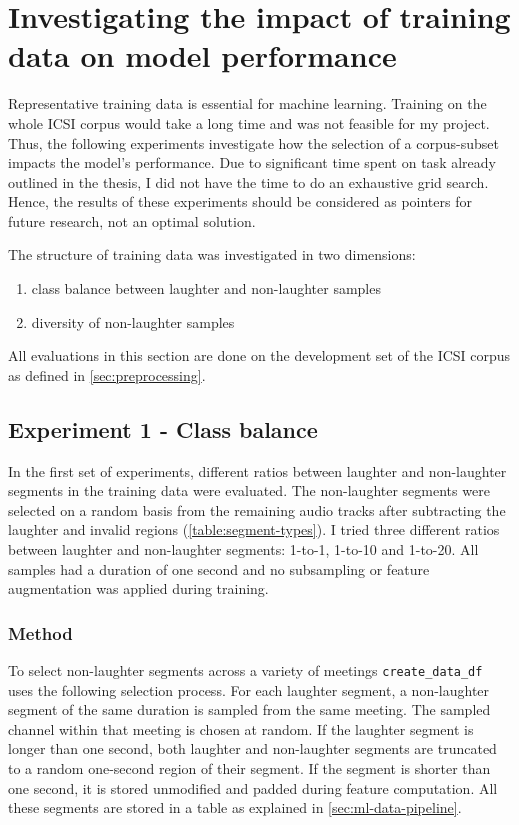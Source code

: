 \documentclass[bsc,frontabs,parskip,deptreport]{infthesis}
\begin{document}
\chapter{Investigating the impact of training data on model performance} \label{cha:experiments}
Representative training data is essential for machine learning. Training on the whole ICSI corpus would take a long time and was not feasible for my project.
Thus, the following experiments investigate how the selection of a corpus-subset impacts the model's performance. 
Due to significant time spent on task already outlined in the thesis, I did not have the time to do an exhaustive grid search. Hence, the results of these experiments should be considered as pointers for future research, not an optimal solution.

The structure of training data was investigated in two dimensions: 
\begin{enumerate}
    \item class balance between laughter and non-laughter samples
    \item diversity of non-laughter samples 
\end{enumerate}

All evaluations in this section are done on the development set of the ICSI corpus as defined in \autoref{sec:preprocessing}.

\section{Experiment 1 - Class balance} \label{sec:exp-1}
In the first set of experiments, different ratios between laughter and non-laughter segments in the training data were evaluated. 
The non-laughter segments were selected on a random basis from the remaining audio tracks after subtracting the laughter and invalid regions (\autoref{table:segment-types}). 
I tried three different ratios between laughter and non-laughter segments: 1-to-1, 1-to-10 and 1-to-20.
All samples had a duration of one second and no subsampling or feature augmentation was applied during training.

\subsection{Method}
To select non-laughter segments across a variety of meetings \verb|create_data_df| uses the following selection process.
For each laughter segment, a non-laughter segment of the same duration is sampled from the same meeting. The sampled channel within that meeting is chosen at random.
If the laughter segment is longer than one second, both laughter and non-laughter segments are truncated to a random one-second region of their segment. 
If the segment is shorter than one second, it is stored unmodified and padded during feature computation.
All these segments are stored in a table as explained in \autoref{sec:ml-data-pipeline}.
\end{document}
